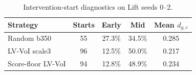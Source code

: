 \begin{table}[t]
\centering
\caption{Intervention-start diagnostics on Lift seeds 0--2.}
\label{tab:trace_diagnostics}
\begin{tabular}{lcccc}
\toprule
Strategy & Starts & Early & Mid & Mean $d_{g,c}$ \\
\midrule
Random b350 & 55 & 27.3\% & 34.5\% & 0.285 \\
LV-VoI scale3 & 96 & 12.5\% & 50.0\% & 0.217 \\
Score-floor LV-VoI & 94 & 12.8\% & 48.9\% & 0.234 \\
\bottomrule
\end{tabular}
\end{table}
